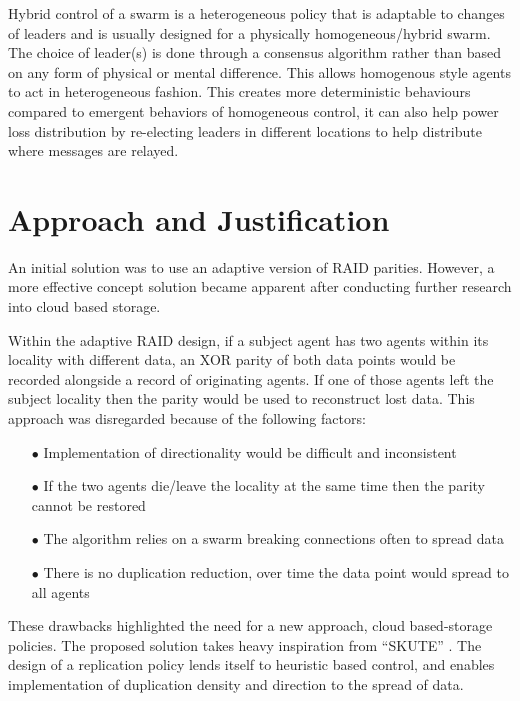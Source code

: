 \documentclass{UoYCSproject}
\begin{document}
Hybrid control of a swarm is a heterogeneous policy that is adaptable to changes of leaders and is usually designed for a physically homogeneous/hybrid swarm.
The choice of leader(s) is done through a consensus algorithm \cite{Paxos} rather than based on any form of physical or mental difference.
This allows homogenous style agents to act in heterogeneous fashion.
This creates more deterministic behaviours compared to emergent behaviors of homogeneous control, it can also help power loss distribution by re-electing leaders in different locations to help distribute where messages are relayed.

\section{Approach and Justification}
\label{sec:Inital Soloution Ideas}

An initial solution was to use an adaptive version of RAID parities. However, a more effective concept solution became apparent after conducting further research into cloud based storage.

Within the adaptive RAID design, if a subject agent has two agents within its locality with different data, an XOR parity of both data points would be recorded alongside a record of originating agents. If one of those agents left the subject locality then the parity would be used to reconstruct lost data. This approach was disregarded because of the following factors:

\begin{itemize}
\itemsep-1em
\item[$\bullet$] Implementation of directionality would be difficult and inconsistent
\item[$\bullet$] If the two agents die/leave the locality at the same time then the parity cannot be restored
\item[$\bullet$] The algorithm relies on a swarm breaking connections often to spread data
\item[$\bullet$] There is no duplication reduction, over time the data point would spread to all agents
\end{itemize}

These drawbacks highlighted the need for a new approach, cloud based-storage policies. The proposed solution takes heavy inspiration from “SKUTE” \cite{Distributed Storage}. The design of a replication policy lends itself to heuristic based control, and enables implementation of duplication density and direction to the spread of data.
\end{document}
